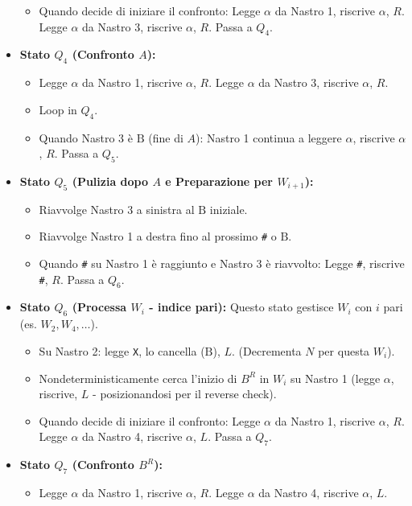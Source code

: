 \documentclass[a4paper]{article}
\newcommand{\B}{\text{B}} %
\begin{document}
\begin{itemize}
\begin{itemize}
            \item Quando decide di iniziare il confronto: Legge $\alpha$ da Nastro 1, riscrive $\alpha$, $R$. Legge $\alpha$ da Nastro 3, riscrive $\alpha$, $R$. Passa a $Q_4$.
        \end{itemize}
    \item \textbf{Stato $Q_4$ (Confronto $A$):}
        \begin{itemize}
            \item Legge $\alpha$ da Nastro 1, riscrive $\alpha$, $R$. Legge $\alpha$ da Nastro 3, riscrive $\alpha$, $R$.
            \item Loop in $Q_4$.
            \item Quando Nastro 3 è $\B$ (fine di $A$): Nastro 1 continua a leggere $\alpha$, riscrive $\alpha$, $R$. Passa a $Q_5$.
        \end{itemize}
    \item \textbf{Stato $Q_5$ (Pulizia dopo $A$ e Preparazione per $W_{i+1}$):}
        \begin{itemize}
            \item Riavvolge Nastro 3 a sinistra al $\B$ iniziale.
            \item Riavvolge Nastro 1 a destra fino al prossimo \texttt{\#} o $\B$.
            \item Quando \texttt{\#} su Nastro 1 è raggiunto e Nastro 3 è riavvolto: Legge \texttt{\#}, riscrive \texttt{\#}, $R$. Passa a $Q_6$.
        \end{itemize}
    \item \textbf{Stato $Q_6$ (Processa $W_i$ - indice pari):}
        Questo stato gestisce $W_i$ con $i$ pari (es. $W_2, W_4, \dots$).
        \begin{itemize}
            \item Su Nastro 2: legge \texttt{X}, lo cancella ($\B$), $L$. (Decrementa $N$ per questa $W_i$).
            \item Nondeterministicamente cerca l'inizio di $B^R$ in $W_i$ su Nastro 1 (legge $\alpha$, riscrive, $L$ - posizionandosi per il reverse check).
            \item Quando decide di iniziare il confronto: Legge $\alpha$ da Nastro 1, riscrive $\alpha$, $R$. Legge $\alpha$ da Nastro 4, riscrive $\alpha$, $L$. Passa a $Q_7$.
        \end{itemize}
    \item \textbf{Stato $Q_7$ (Confronto $B^R$):}
        \begin{itemize}
            \item Legge $\alpha$ da Nastro 1, riscrive $\alpha$, $R$. Legge $\alpha$ da Nastro 4, riscrive $\alpha$, $L$.

\end{itemize}
\end{itemize}
\end{document}
